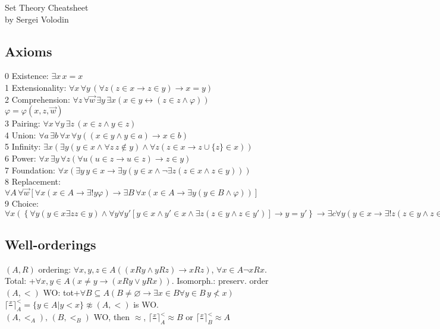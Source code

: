 \documentclass[twocolumn]{article}
\begin{document}
\begin{center}
	{\large Set Theory Cheatsheet}\\
	by Sergei Volodin
\end{center}
\subsection*{Axioms}
0 Existence: $\exists x\, x=x$\\
1 Extensionality: $\forall x\,\forall y\,\left(\forall z \left(z\in x\to z\in y\right)\to x=y \right)$\\
2 Comprehension: $\forall z\,\forall \vec{w}\,\exists y\,\exists x\left(x\in y\leftrightarrow \left(z\in z \wedge\varphi\right)\right)$\\
$\varphi=\varphi(x,z,\vec{w})$\\
3 Pairing: $\forall x\,\forall y\,\exists z\,\left(x\in z\wedge y\in z\right)$\\
4 Union: $\forall a\,\exists b\,\forall x\,\forall y\left((x\in y\wedge y\in a)\to x\in b\right)$\\
5 Infinity: $\exists x\left(\exists y(y\in x\wedge\forall z\,z\notin y)\wedge \forall z(z\in x\to z\cup \{z\}\in x)\right)$\\
6 Power: $\forall x\,\exists y\,\forall z\left(\forall u(u\in z\to u\in z)\to z\in y\right)$\\
7 Foundation: $\forall x\left(\exists y\,y\in x\to\exists y(y\in x\wedge \neg \exists z(z\in x\wedge z\in y))\right)$\\
8 Replacement: $\forall A\,\forall\vec{w}\left[\forall x(x\in A\to\exists !y\varphi)\to\exists B\,\forall x(x\in A\to \exists y(y\in B\wedge \varphi))\right]$\\
9 Choice: $\forall x\left(\left\{\forall y(y\in x\exists z z\in y)\wedge \forall y\forall y'\left[y\in x\wedge y'\in x\wedge \exists z (z\in y\wedge z\in y')\right]\to y=y'\right\}\to\exists c\forall y(y\in x\to\exists !z(z\in y\wedge z\in c))\right)$
\subsection*{Well-orderings}
$(A,R)$ ordering: $\forall x,y,z\in A\left((xRy\wedge yRz)\to xRz\right)$,
$\forall x\in A\neg xRx$.\\
Total: +$\forall x,y\in A\left(x\neq y\to(xRy\vee yRx)\right)$.
Isomorph.: preserv. order\\
$(A,<)$ WO: tot+$\forall B\subseteq A\left(B\neq \varnothing\to \exists x\in B\forall y\in B\,y\nless x\right)$\\
$\lceil \frac{x}{\,}\rceil_A^<=\{y\in A|y<x\}\not\approx (A,<)$ is WO.\\
$(A,<_A),\,(B,<_B)$ WO, then $\approx$, $\lceil \frac{x}{\,}\rceil_A^<\approx B$ or $\lceil \frac{x}{\,}\rceil_B^<\approx A$\\
\end{document}

